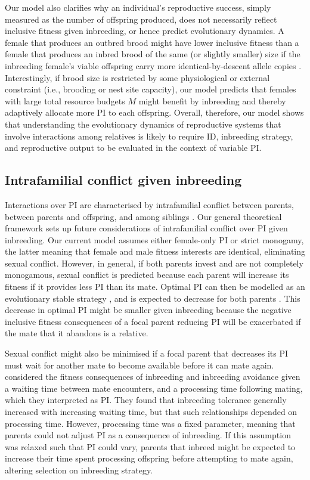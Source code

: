 \documentclass[10pt,letterpaper]{article}
\begin{document}
Our model also clarifies why an individual's reproductive success, simply measured as the number of offspring produced, does not necessarily reflect inclusive fitness given inbreeding, or hence predict evolutionary dynamics. A female that produces an outbred brood might have lower inclusive fitness than a female that produces an inbred brood of the same (or slightly smaller) size if the inbreeding female's viable offspring carry more identical-by-descent allele copies \cite[see also][]{Reid2016}. Interestingly, if brood size is restricted by some physiological or external constraint (i.e., brooding or nest site capacity), our model predicts that females with large total resource budgets $M$ might benefit by inbreeding and thereby adaptively allocate more PI to each offspring. Overall, therefore, our model shows that understanding the evolutionary dynamics of reproductive systems that involve interactions among relatives is likely to require ID, inbreeding strategy, and reproductive output to be evaluated in the context of variable PI.


\subsection*{Intrafamilial conflict given inbreeding}

Interactions over PI are characterised by intrafamilial conflict between parents, between parents and offspring, and among siblings \cite[][]{Parker2002}. Our general theoretical framework sets up future considerations of intrafamilial conflict over PI given inbreeding. Our current model assumes either female-only PI or strict monogamy, the latter meaning that female and male fitness interests are identical, eliminating sexual conflict. However, in general, if both parents invest and are not completely monogamous, sexual conflict is predicted because each parent will increase its fitness if it provides less PI than its mate. Optimal PI can then be modelled as an evolutionary stable strategy \cite[][]{Smith1977}, and is expected to decrease for both parents \cite[][]{Parker1985}. This decrease in optimal PI might be smaller given inbreeding because the negative inclusive fitness consequences of a focal parent reducing PI will be exacerbated if the mate that it abandons is a relative. 

Sexual conflict might also be minimised if a focal parent that decreases its PI must wait for another mate to become available before it can mate again. \cite{Kokko2006} considered the fitness consequences of inbreeding and inbreeding avoidance given a waiting time between mate encounters, and a processing time following mating, which they interpreted as PI. They found that inbreeding tolerance generally increased with increasing waiting time, but that such relationships depended on processing time. However, processing time was a fixed parameter, meaning that parents could not adjust PI as a consequence of inbreeding. If this assumption was relaxed such that PI could vary, parents that inbreed might be expected to increase their time spent processing offspring before attempting to mate again, altering selection on inbreeding strategy.
\end{document}
